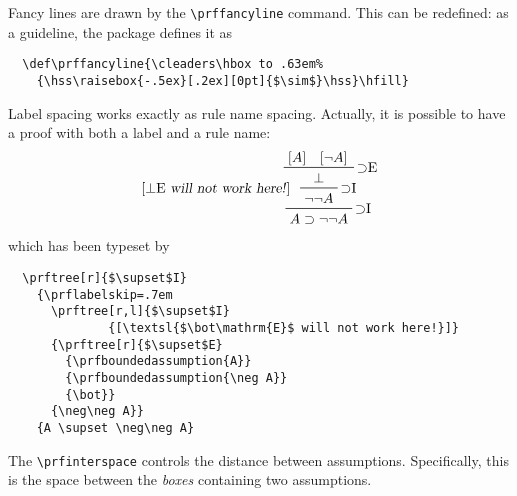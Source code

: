 \documentclass{amsart}
\begin{document}
Fancy lines are drawn by the \verb|\prffancyline| command. This can be
redefined: as a guideline, the package defines it as
\begin{verbatim}
  \def\prffancyline{\cleaders\hbox to .63em%
    {\hss\raisebox{-.5ex}[.2ex][0pt]{$\sim$}\hss}\hfill}
\end{verbatim}\vspace{2ex}

Label spacing works exactly as rule name spacing. Actually, it is
possible to have a proof with both a label and a rule name:
\begin{displaymath}
  \prftree[r]{$\supset$I}
    {\prflabelskip=.7em
      \prftree[r,l]{$\supset$I}
              {[\textsl{$\bot\mathrm{E}$ will not work here!}]}
      {\prftree[r]{$\supset$E}
        {\prfboundedassumption{A}}
        {\prfboundedassumption{\neg A}}
        {\bot}}
      {\neg\neg A}}
    {A \supset \neg\neg A}
\end{displaymath}
which has been typeset by
\begin{verbatim}
  \prftree[r]{$\supset$I}
    {\prflabelskip=.7em
      \prftree[r,l]{$\supset$I}
              {[\textsl{$\bot\mathrm{E}$ will not work here!}]} 
      {\prftree[r]{$\supset$E}
        {\prfboundedassumption{A}}
        {\prfboundedassumption{\neg A}}
        {\bot}}
      {\neg\neg A}}
    {A \supset \neg\neg A}
\end{verbatim}\vspace{2ex}

The \verb|\prfinterspace| controls the distance between
assumptions. Specifically, this is the space between the \emph{boxes}
containing two assumptions. 
\end{document}
